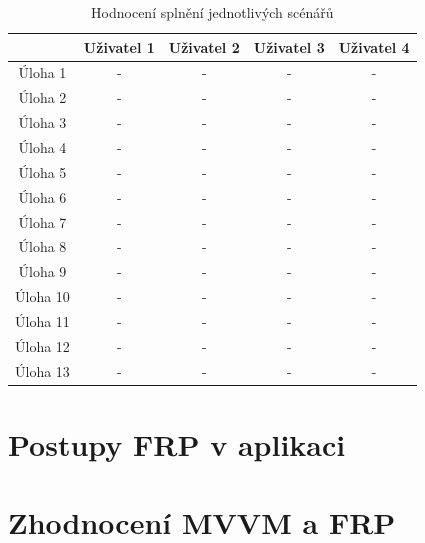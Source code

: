 \documentclass[thesis=M,czech]{FITthesis}[2012/06/26]
\begin{document}
\begin{table}\centering
 \begin{tabular}{ c | c | c | c | c |}
 	 & Uživatel 1 & Uživatel 2 & Uživatel 3 & Uživatel 4 \\
 	\hline
 	Úloha 1  & - & - & - & -\\
 	Úloha 2  & - & - & - & - \\
 	Úloha 3  & - & - & - & -\\
 	Úloha 4  & - & - & - & -\\
 	Úloha 5  & - & - & - & -\\
 	Úloha 6  & - & - & - & -\\
 	Úloha 7  & - & - & - & -\\
 	Úloha 8  & - & - & - & -\\
 	Úloha 9  & - & - & - & -\\
 	Úloha 10 & - & - & - & -\\
 	Úloha 11 & - & - & - & -\\
 	Úloha 12 & - & - & - & -\\
 	Úloha 13 & - & - & - & -\\
 \end{tabular}
 \caption[Hodnocení splnění jednotlivých scénářů]{Hodnocení splnění jednotlivých scénářů}\label{tab:ut_eval}
\end{table}


\section{Postupy FRP v aplikaci}
\section{Zhodnocení MVVM a FRP}

\begin{conclusion}
\end{conclusion}




\appendix
\end{document}
